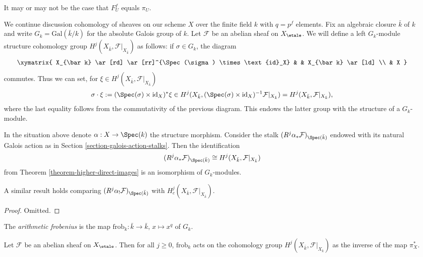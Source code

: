 \begin{remark}
\label{remark-may-be-confusing}
It may or may not be the case that $F^f_U$ equals $\pi_U$.
\end{remark}

\noindent
We continue discussion cohomology of sheaves on our scheme $X$ over
the finite field $k$ with $q = p^f$ elements.
Fix an algebraic closure $\bar k$ of $k$ and write $G_k =
\text{Gal}(\bar k/k)$ for the absolute Galois group of $k$.
Let $\mathcal{F}$ be an abelian sheaf on $X_\etale$.
We will define a left $G_k$-module structure
cohomology group $H^j (X_{\bar k}, \mathcal{F}|_{X_{\bar k}})$
as follows: if $\sigma \in G_k$, the diagram
$$
\xymatrix{
X_{\bar k} \ar[rd] \ar[rr]^{\Spec(\sigma) \times \text{id}_X} & &
X_{\bar k} \ar[ld] \\
& X
}
$$
commutes. Thus we can set, for $\xi \in H^j (X_{\bar k}, \mathcal{F}|_{X_{\bar
k}})$
$$
\sigma \cdot \xi := (\Spec(\sigma) \times \text{id}_X)^*\xi \in
H^j(X_{\bar k}, (\Spec(\sigma) \times \text{id}_X)^{-1}
\mathcal{F}|_{X_{\bar k}})
= H^j (X_{\bar k}, \mathcal{F}|_{X_{\bar k}}),
$$
where the last equality follows from the commutativity of the previous diagram.
This endows the latter group with the structure of a $G_k$-module.

\begin{lemma}
\label{lemma-two-actions-agree}
In the situation above denote $\alpha : X \to \Spec(k)$ the structure morphism.
Consider the stalk $(R^j\alpha_*\mathcal{F})_{\Spec(\bar k)}$ endowed with its
natural Galois action as in Section \ref{section-galois-action-stalks}. Then
the identification
$$
(R^j\alpha_*\mathcal{F})_{\Spec(\bar k)} \cong H^j (X_{\bar k},
\mathcal{F}|_{X_{\bar k}})
$$
from Theorem \ref{theorem-higher-direct-images} is an isomorphism of
$G_k$-modules.
\end{lemma}

\noindent
A similar result holds comparing
$(R^j\alpha_!\mathcal{F})_{\Spec(\bar k)}$ with
$H^j_c (X_{\bar k}, \mathcal{F}|_{X_{\bar k}})$.

\begin{proof}
Omitted.
\end{proof}

\begin{definition}
\label{definition-arithmetic-frobenius}
The {\it arithmetic frobenius} is the map
$\text{frob}_k : \bar k \to \bar k$, $x \mapsto x^q$ of $G_k$.
\end{definition}

\begin{theorem}
\label{theorem-geometric-arithmetic-inverse}
Let $\mathcal{F}$ be an abelian sheaf on $X_\etale$. Then for all
$j\geq 0$, $\text{frob}_k$ acts on the cohomology group $H^j(X_{\bar k},
\mathcal{F}|_{X_{\bar k}})$ as the inverse of the map $\pi_X^*$.
\end{theorem}

